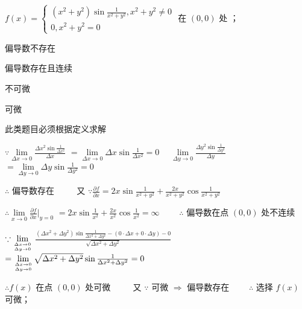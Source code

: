 \begin{question}[points = 3]
    $f(x) = \begin{cases}
            (x^2 + y^2)\sin{\frac{1}{x^2 + y^2}}, x^2 + y^2 \neq 0 \\
            0, x^2 + y^2 = 0
        \end{cases}$ 在 $(0, 0)$ 处 \paren[D]；
\end{question}
\begin{choices}
    \item 偏导数不存在
    \item 偏导数存在且连续
    \item 不可微
    \item 可微
\end{choices}
\begin{solution}
    此类题目必须根据定义求解

    $\because \lim\limits_{\Delta x \to 0} \frac{\Delta x^2\sin{\frac{1}{\Delta x^2}}}{\Delta x}$
    $= \lim\limits_{\Delta x \to 0} \Delta x\sin{\frac{1}{\Delta x^2}} = 0 \quad$
    $\lim\limits_{\Delta y \to 0} \frac{\Delta y^2\sin{\frac{1}{\Delta y^2}}}{\Delta y}$
    $= \lim\limits_{\Delta y \to 0} \Delta y\sin{\frac{1}{\Delta y^2}} = 0$

    $\therefore$ 偏导数存在 $\qquad$
    又 $\because \frac{\partial f}{\partial x} = 2x\sin{\frac{1}{x^2 + y^2}} + \frac{2x}{x^2 + y^2}\cos{\frac{1}{x^2 + y^2}}$

    $\therefore \lim\limits_{x \to 0} \frac{\partial f}{\partial x}|_{y = 0}$
    $= 2x\sin{\frac{1}{x^2}} + \frac{2x}{x^2}\cos{\frac{1}{x^2}} = \infty \qquad$
    $\therefore$ 偏导数在点 $(0, 0)$ 处不连续

    $\because \lim\limits_{\Delta x \to 0 \atop \Delta y \to 0}$
    $\frac{(\Delta x^2 + \Delta y^2)\sin{\frac{1}{\Delta x^2 + \Delta y^2}} - (0 \cdot \Delta x + 0 \cdot \Delta y) - 0}{\sqrt{\Delta x^2 + \Delta y^2}}$
    $= \lim\limits_{\Delta x \to 0 \atop \Delta y \to 0} \sqrt{\Delta x^2 + \Delta y^2}\sin{\frac{1}{\Delta x^2 + \Delta y^2}} = 0$

    $\therefore f(x)$ 在点 $(0, 0)$ 处可微 $\qquad$ 又 $\because$ 可微 $\Rightarrow$ 偏导数存在 $\qquad \therefore$ 选择 $f(x)$ 可微；
\end{solution}

